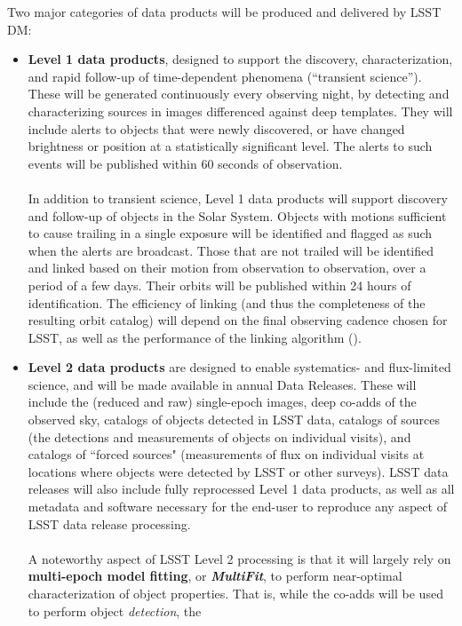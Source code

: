 \documentclass[11pt,twoside]{article}
\begin{document}
Two major categories of data products will be produced and delivered by LSST DM:
\begin{itemize}
\item {\bf Level 1 data products}, designed to support the discovery,
  characterization, and rapid follow-up of time-dependent phenomena
  (``transient science''). These will be generated continuously every
  observing night, by detecting and characterizing sources in images
  differenced against deep templates. They will include alerts to
  objects that were newly discovered, or have changed brightness or
  position at a statistically significant level. The alerts to such
  events will be published within 60   seconds of observation.\\
\\
In addition to transient science, Level 1 data products will support
discovery and follow-up of objects in the Solar System. Objects with
motions sufficient to cause trailing in a single exposure will be
identified and flagged as such when the alerts are broadcast. Those
that are not trailed will be identified and linked based on their
motion from observation to observation, over a period of a few
days. Their orbits will be published within 24 hours of
identification. The efficiency of linking (and thus the completeness
of the resulting orbit catalog) will depend on the final observing
cadence chosen for LSST, as well as the performance of the linking
algorithm (\citep{MOPSIAU}).
\item {\bf Level 2 data products} are designed to enable systematics- and flux-limited science, and will be made available in annual Data Releases. These will include the (reduced and raw) single-epoch images, deep co-adds of the observed sky, catalogs of objects detected in LSST data, catalogs of sources (the detections and measurements of objects on individual visits), and catalogs of ``forced sources" (measurements of flux on individual visits at locations where objects were detected by LSST or other surveys). LSST data releases will also include fully reprocessed Level 1 data products, as well as all metadata and software necessary for the end-user to reproduce any aspect of LSST data release processing.\\
\\
A noteworthy aspect of LSST Level 2 processing is that it will largely
rely on {\bf multi-epoch model fitting}, or {\bf \em MultiFit}, to
perform near-optimal characterization of object properties. That is,
while the co-adds will be used to perform object {\em detection}, the

\end{itemize}
\end{document}
